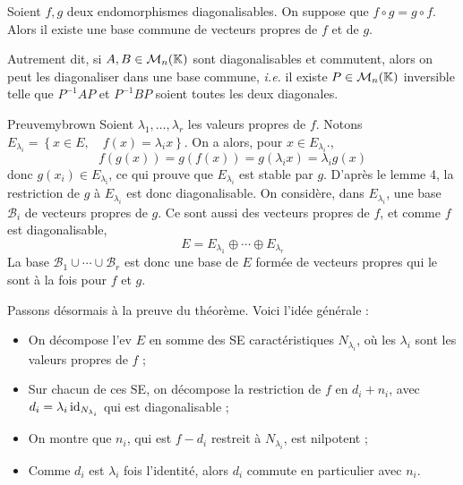    \begin{lem}{}{}
        Soient $f,g$ deux endomorphismes diagonalisables. On suppose que $f \circ g = g \circ f$. Alors il existe une base commune de vecteurs propres de $f$ et de $g$. 
    \end{lem}

    Autrement dit, si $A,B \in \mathcal{M}_{n}(\mathbb{K})$ sont diagonalisables et commutent, alors on peut les diagonaliser dans une base commune, \textit{i.e.} il existe $P \in \mathcal{M}_{n}(\mathbb{K})$ inversible telle que $P^{-1} A P$ et $P^{-1} B P$ soient toutes les deux diagonales.

    \begin{demo}{Preuve}{mybrown}
        Soient $\lambda_1,\ldots,\lambda_r$ les valeurs propres de $f$. Notons $E_{\lambda_i} = \left\{x \in E, \quad f(x) = \lambda_i x\right\}$. On a alors, pour $x \in E_{\lambda_i}$., 
        \[ f(g(x)) = g(f(x)) = g(\lambda_ix) = \lambda_i g(x) \]   
        donc $g(x_i) \in E_{\lambda_ï}$, ce qui prouve que $E_{\lambda_i}$ est stable par $g$. D’après le lemme 4, la restriction de $g$ à $E_{\lambda_i}$ est donc diagonalisable. On considère, dans $E_{\lambda_i}$, une base $\mathcal{B}_i$ de vecteurs propres de $g$. Ce sont aussi des vecteurs propres de $f$, et comme $f$ est diagonalisable, 
        \[ E = E_{\lambda_1} \oplus \cdots \oplus E_{\lambda_r} \]   
        La base $\mathcal{B}_1 \cup \cdots \cup \mathcal{B}_r$ est donc une base de $E$ formée de vecteurs propres qui le sont à la fois pour $f$ et $g$.
    \end{demo}

    Passons désormais à la preuve du théorème. Voici l’idée générale :
    \begin{itemize}
        \item On décompose l’ev $E$ en somme des SE caractéristiques $N_{\lambda_i}$, où les $\lambda_i$ sont les valeurs propres de $f$ ;
        \item Sur chacun de ces SE, on décompose la restriction de $f$ en $d_i + n_i$, avec $d_i = \lambda_i \operatorname{id}_{N_{\lambda_i}}$ qui est diagonalisable ;
        \item On montre que $n_i$, qui est $f- d_i$ restreit à $N_{\lambda_i}$, est nilpotent ;
        \item Comme $d_i$ est $\lambda_i$ fois l’identité, alors $d_i$ commute en particulier avec $n_i$.
    \end{itemize}

